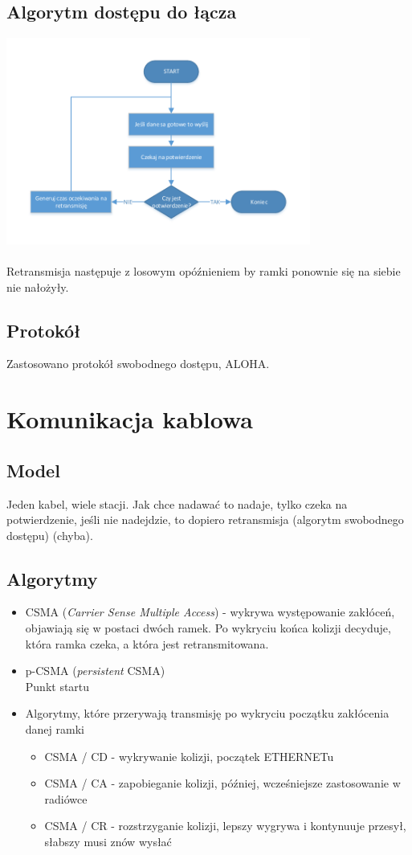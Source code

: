 \documentclass[a4paper,twoside]{article}
\begin{document}
\subsection{Algorytm dostępu do łącza}
\includegraphics[width=10cm]{./images/image19.pdf}\\\\
Retransmisja następuje z losowym opóźnieniem by ramki ponownie się na siebie nie nałożyły.\\
\subsection{Protokół}
Zastosowano protokół swobodnego dostępu, ALOHA.

\section{Komunikacja kablowa}
	\subsection{Model}
	Jeden kabel, wiele stacji. Jak chce nadawać to nadaje, tylko czeka na potwierdzenie, jeśli nie nadejdzie, to dopiero retransmisja (algorytm swobodnego dostępu) (chyba). 
	\subsection{Algorytmy}
	\begin{itemize}
		\item CSMA (\emph{Carrier Sense Multiple Access}) - wykrywa występowanie zakłóceń, objawiają się w postaci dwóch ramek. Po wykryciu końca kolizji decyduje, która ramka czeka, a która jest retransmitowana.
		\item p-CSMA (\emph{persistent} CSMA)\\
		Punkt startu
		\item Algorytmy, które przerywają transmisję po wykryciu początku zakłócenia danej ramki
		\begin{itemize}
			\item CSMA / CD - wykrywanie kolizji, początek ETHERNETu
			\item CSMA / CA - zapobieganie kolizji, później, wcześniejsze zastosowanie w radiówce
			\item CSMA / CR - rozstrzyganie kolizji, lepszy wygrywa i kontynuuje przesył, słabszy musi znów wysłać
		\end{itemize}
	\end{itemize}
	
\end{document}
